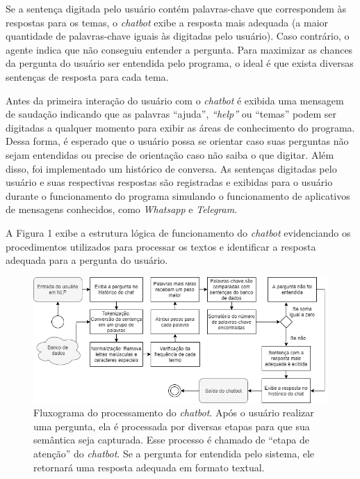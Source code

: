 \documentclass[12pt]{article}
\begin{document}
Se a sentença digitada pelo usuário contém palavras-chave que correspondem às respostas para os temas, o {\itshape chatbot} exibe a resposta mais adequada (a maior quantidade de palavras-chave iguais às digitadas pelo usuário). Caso contrário, o agente indica que não conseguiu entender a pergunta. Para maximizar as chances da pergunta do usuário ser entendida pelo programa, o ideal é que exista diversas sentenças de resposta para cada tema.

Antes da primeira interação do usuário com o {\itshape chatbot} é exibida uma mensagem de saudação indicando que as palavras “ajuda”, {\itshape “help”} ou “temas” podem ser digitadas a qualquer momento para exibir as áreas de conhecimento do programa. Dessa forma, é esperado que o usuário possa se orientar caso suas perguntas não sejam entendidas ou precise de orientação caso não saiba o que digitar. Além disso, foi implementado um histórico de conversa. As sentenças digitadas pelo usuário e suas respectivas respostas são registradas e exibidas para o usuário durante o funcionamento do programa simulando o funcionamento de aplicativos de mensagens conhecidos, como {\itshape Whatsapp} e {\itshape Telegram}.

A Figura 1 exibe a estrutura lógica de funcionamento do {\itshape chatbot} evidenciando os procedimentos utilizados para processar os textos e identificar a resposta adequada para a pergunta do usuário.

\begin{figure}[ht]
\centering
\includegraphics[width=1\textwidth]{fig1.png}
\caption{Fluxograma do processamento do {\itshape chatbot}. Após o usuário realizar uma pergunta, ela é processada por diversas etapas para que sua semântica seja capturada. Esse processo é chamado de “etapa de atenção” do {\itshape chatbot}. Se a pergunta for entendida pelo sistema, ele retornará uma resposta adequada em formato textual. }
\label{fig:exampleFig1}
\end{figure}
\end{document}
